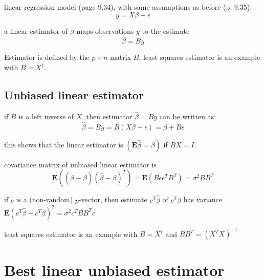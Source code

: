 \begin{problem}
    linear regression model (page 9.34), with same assumptions as before (p. 9.35):
$$
y=X \beta+\epsilon
$$
\end{problem}

\begin{definition}
    a linear estimator of $ \beta $ maps observations $ y $ to the estimate
$$
\hat{\beta}=B y
$$

Estimator is defined by the $ p \times n $ matrix $ B $, least squares estimator is an example with $ B=X^{\dagger} $.
\end{definition}




\subsection{Unbiased linear estimator}

\begin{theorem}
    if $ B $ is a left inverse of $ X $, then estimator $ \hat{\beta}=B y $ can be written as:
$$
\hat{\beta}=B y=B(X \beta+\epsilon)=\beta+B \epsilon
$$
\end{theorem}

\begin{corollary}
    this shows that the linear estimator is  $ (\mathbf{E} \hat{\beta}=\beta) $ if $ B X=I $.
\end{corollary}

\begin{theorem}
    covariance matrix of unbiased linear estimator is
$$
\mathbf{E}\left((\hat{\beta}-\beta)(\hat{\beta}-\beta)^{T}\right)=\mathbf{E}\left(B \epsilon \epsilon^{T} B^{T}\right)=\sigma^{2} B B^{T}
$$
\end{theorem}

\begin{theorem}
    if $ c $ is a (non-random) $ p $-vector, then estimate $ c^{T} \hat{\beta} $ of $ c^{T} \beta $ has variance
$ \mathbf{E}\left(c^{T} \hat{\beta}-c^{T} \beta\right)^{2}=\sigma^{2} c^{T} B B^{T} c $
\end{theorem}

\begin{corollary}
    least squares estimator is an example with $ B=X^{\dagger} $ and $ B B^{T}=\left(X^{T} X\right)^{-1} $
\end{corollary}



\section{Best linear unbiased estimator}

